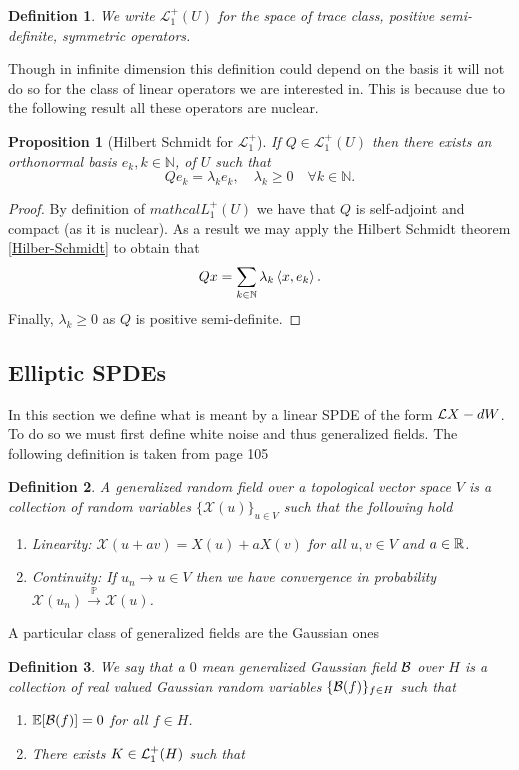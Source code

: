 \documentclass[12pt]{article}
\newtheorem{proposition}{Proposition}
\newtheorem{definition}{Definition}
\newcommand{\br}[1]{\left\langle#1\right\rangle}
\begin{document}
\begin{definition}
	We write $\mathcal{L}_1^+(U)$ for the space of trace class, positive semi-definite, symmetric operators.
\end{definition}
Though in infinite dimension this definition could depend on the basis it will not do so for the class of linear operators we are interested in. This is because due to the following result all these operators are nuclear.
\begin{proposition}[Hilbert Schmidt for $\mathcal{L}_1^+$]
	If $Q \in \mathcal{L}_1^+(U)$ then there exists an orthonormal basis $e_{k}, k \in \mathbb{N}$, of $U$ such that
	$$
		Q e_{k}=\lambda_{k} e_{k}, \quad \lambda_{k} \geq 0\quad \forall k \in \mathbb{N}.
	$$
\end{proposition}
\begin{proof}
	By definition of $mathcal{L}_1^+(U)$ we have that $Q$ is self-adjoint and compact (as it is nuclear).
	As a result we may apply the Hilbert Schmidt theorem \ref{Hilber-Schmidt} to obtain that
	\begin{equation*}
		Q x=\sum_{k\in\N}\lambda_{k} \br{x,e_{k}}.
	\end{equation*}
	Finally, $\lambda_k\geq 0$ as $Q$ is positive semi-definite.
\end{proof}
\subsection{Elliptic SPDEs}
In this section we define what is meant by a linear SPDE of the form $\mathcal{L} X-dW$. To do so we must first define white noise and thus generalized fields. The following definition is taken from \cite{lototsky2017stochastic} page 105
\begin{definition}
	A generalized random field over a topological vector space $V$ is a collection of random variables  $\{\mathcal{X}(u)\}_{u\in V}$ such that the following hold
	\begin{enumerate}
		\item \emph{Linearity}: $\mathcal{X}(u+av)=X(u)+aX(v)$ for all  $u,v\in V$ and $a\in {\mathbb R}$.
		\item \emph{Continuity}: If $u_n\to u\in V$ then we have convergence in probability $\mathcal{X}(u_n)\xrightarrow{\mathbb{P}}\mathcal{X}(u)$.
	\end{enumerate}
\end{definition}
A particular class of generalized fields are the Gaussian ones
\begin{definition}
	We say that a $0$ mean \emph{generalized Gaussian field} $\mathcal{B}$ over $H$ is a collection of real valued Gaussian random variables $\{\mathcal{B}(f)\}_{f\in H} $ such that
	\begin{enumerate}
		\item $\mathbb{E}[\mathcal{B}(f)]=0$ for all $f\in H$.
		\item There exists $K\in \mathcal{L}_1^+(H)$ such that
	\end{enumerate}
\end{definition}

\end{document}
